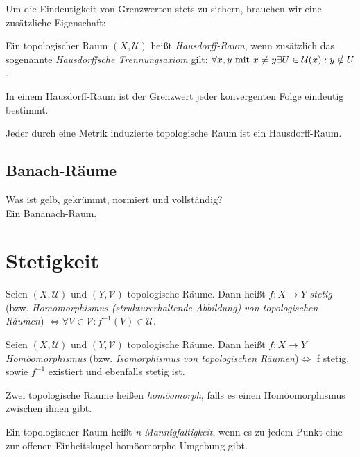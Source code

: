 \documentclass[10pt]{scrbook}
\begin{document}
Um die Eindeutigkeit von Grenzwerten stets zu sichern, brauchen wir eine zusätzliche Eigenschaft:

\begin{Def}
Ein topologischer Raum $(X, \mathcal{U})$ heißt \emph{Hausdorff-Raum}, wenn zusätzlich das sogenannte \emph{Hausdorffsche Trennungsaxiom} gilt: $\forall x, y\textnormal{ mit } x\neq y\exists U\in\mathcal{U}(x): y\notin U$.
\end{Def}

\begin{Sa}
In einem Hausdorff-Raum ist der Grenzwert jeder konvergenten Folge eindeutig bestimmt.
\end{Sa}

\begin{Sa}
Jeder durch eine Metrik induzierte topologische Raum ist ein Hausdorff-Raum.
\end{Sa}

\subsection{Banach-Räume}

Was ist gelb, gekrümmt, normiert und vollständig? \\
Ein Bananach-Raum.

\section{Stetigkeit}

\begin{Def}
Seien $(X, \mathcal{U})$ und $(Y, \mathcal{V})$ topologische Räume. Dann heißt $f: X\rightarrow Y$ \emph{stetig} (bzw. \emph{Homomorphismus (strukturerhaltende Abbildung) von topologischen Räumen}) $\Leftrightarrow \forall V\in \mathcal{V}: f^{-1}(V)\in \mathcal{U}$.
\end{Def}

\begin{Def}
Seien $(X, \mathcal{U})$ und $(Y, \mathcal{V})$ topologische Räume. Dann heißt $f: X\rightarrow Y$ \emph{Homöomorphismus} (bzw. \emph{Isomorphismus von topologischen Räumen})$\Leftrightarrow$ f stetig, sowie $f^{-1}$ existiert und ebenfalls stetig ist.

Zwei topologische Räume heißen \emph{homöomorph}, falls es einen Homöomorphismus zwischen ihnen gibt.
\end{Def}

\begin{Def}
Ein topologischer Raum heißt \emph{n-Mannigfaltigkeit}, wenn es zu jedem Punkt eine zur offenen Einheitskugel homöomorphe Umgebung gibt.
\end{Def}
\end{document}
